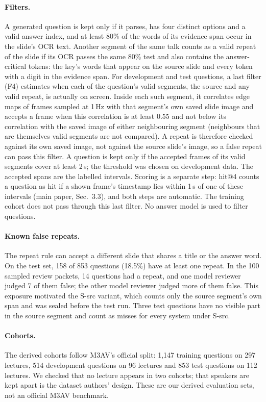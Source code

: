 \paragraph{Filters.}
A generated question is kept only if it parses, has four distinct options and a valid answer index, and at least 80\% of the words of its evidence span occur in the slide's OCR text.
Another segment of the same talk counts as a valid repeat of the slide if its OCR passes the same 80\% test and also contains the answer-critical tokens: the key's words that appear on the source slide and every token with a digit in the evidence span.
For development and test questions, a last filter (F4) estimates when each of the question's valid segments, the source and any valid repeat, is actually on screen.
Inside each such segment, it correlates edge maps of frames sampled at 1\,Hz with that segment's own saved slide image and accepts a frame when this correlation is at least 0.55 and not below its correlation with the saved image of either neighbouring segment (neighbours that are themselves valid segments are not compared).
A repeat is therefore checked against its own saved image, not against the source slide's image, so a false repeat can pass this filter.
A question is kept only if the accepted frames of its valid segments cover at least 2\,s; the threshold was chosen on development data.
The accepted spans are the labelled intervals.
Scoring is a separate step: hit@4 counts a question as hit if a shown frame's timestamp lies within 1\,s of one of these intervals (main paper, Sec.~3.3), and both steps are automatic.
The training cohort does not pass through this last filter.
No answer model is used to filter questions.

\paragraph{Known false repeats.}
The repeat rule can accept a different slide that shares a title or the answer word.
On the test set, 158 of 853 questions (18.5\%) have at least one repeat.
In the 100 sampled review packets, 14 questions had a repeat, and one model reviewer judged 7 of them false; the other model reviewer judged more of them false.
This exposure motivated the S-src variant, which counts only the source segment's own span and was sealed before the test run.
Three test questions have no visible part in the source segment and count as misses for every system under S-src.

\paragraph{Cohorts.}
The derived cohorts follow M3AV's official split: 1,147 training questions on 297 lectures, 514 development questions on 96 lectures and 853 test questions on 112 lectures.
We checked that no lecture appears in two cohorts; that speakers are kept apart is the dataset authors' design.
These are our derived evaluation sets, not an official M3AV benchmark.

